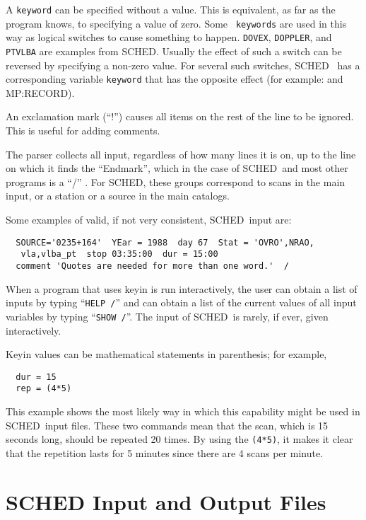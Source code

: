 \documentclass{report}
\newcommand{\sched}{{\sc SCHED}}
\newcommand{\schedb}{{\sc SCHED~}}
\begin{document}
A {\tt keyword} can be specified without a value. This is equivalent,
as far as the program knows, to specifying a value of zero. Some {\tt
keywords} are used in this way as logical switches to cause something
to happen. {\tt DOVEX}, {\tt DOPPLER}, and {\tt PTVLBA} are examples from
\sched. Usually the effect of such a switch can be reversed by
specifying a non-zero value.  For several such switches, \schedb
has a corresponding variable {\tt keyword} that has the opposite effect
(for example:  and 
{MP:RECORD}).

An exclamation mark (``!'') causes all items on the rest of the line
to be ignored. This is useful for adding comments.

The parser collects all input, regardless of how many lines it is on,
up to the line on which it finds the ``Endmark'', which in the case of
\schedb and most other programs is a ``/'' .  For \sched, these
groups correspond to scans in the main input, or a station or a source
in the main catalogs.

Some examples of valid, if not very consistent, \schedb input are:

\begin{verbatim}
  SOURCE='0235+164'  YEar = 1988  day 67  Stat = 'OVRO',NRAO,
   vla,vlba_pt  stop 03:35:00  dur = 15:00
  comment 'Quotes are needed for more than one word.'  /
\end{verbatim}

When a program that uses keyin is run interactively, the user can
obtain a list of inputs by typing ``{\tt HELP /}'' and can obtain a list of
the current values of all input variables by typing ``{\tt SHOW /}''.
The input of \schedb is rarely, if ever, given interactively.

Keyin values can be mathematical statements in parenthesis; for
example,
\begin{verbatim}
  dur = 15
  rep = (4*5)
\end{verbatim}
This example shows the most likely way in which this capability might
be used in \schedb input files.  These two commands mean that
the scan, which is 15 seconds long, should be repeated 20 times.
By using the {\tt (4*5)}, it makes it clear that the repetition
lasts for 5 minutes since there are 4 scans per minute.

\section{\label{SEC:FILES} SCHED Input and Output Files}
\end{document}
